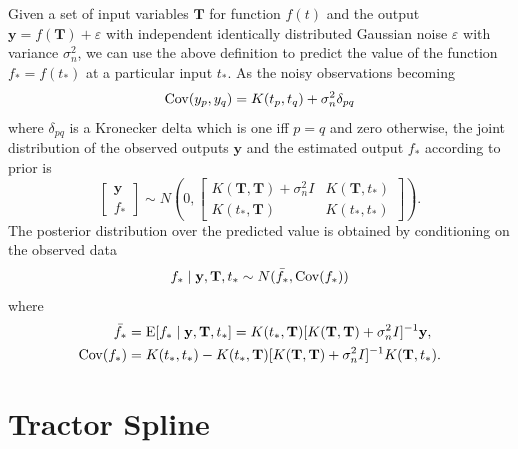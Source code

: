 Given a set of input variables $\mathbf{T}$ for function $f(t)$ and the output $\mathbf{y}=f(\mathbf{T})+\varepsilon$ with independent identically distributed Gaussian noise $\varepsilon$ with variance $\sigma_n^2$,  we can use the above definition to predict the value of the function $f_*=f(t_*)$ at a particular input $t_*$. As the noisy observations becoming
\begin{align}\label{GaussianProcessCovDef}
\mathrm{Cov} (y_p,y_q) = K(t_p,t_q)+\sigma_n^2 \delta_{pq}
\end{align}
where $\delta_{pq}$ is a Kronecker delta which is one iff $p=q$ and zero otherwise, the joint distribution of the observed outputs $\mathbf{y}$ and the estimated output $f_*$ according to prior is
\begin{equation}
\begin{bmatrix}
\mathbf{y}\\
f_*
\end{bmatrix} \sim N \left(  
0,  \begin{bmatrix}
K(\mathbf{T},\mathbf{T}) +\sigma_n^2I& K(\mathbf{T},t_*) \\
K(t_*,\mathbf{T}) & K(t_*,t_*)
\end{bmatrix} 
\right).
\end{equation}
The posterior distribution over the predicted value is obtained by conditioning on the observed data
\begin{equation}
f_* \mid  \mathbf{y},\mathbf{T},t_* \sim N(\bar{f_*},\mathrm{Cov} (f_*))
\end{equation}
where 
\begin{align}
\bar{f_*}&=\mathrm{E} [f_* \mid  \mathbf{y},\mathbf{T},t_* ]=K(t_*,\mathbf{T})[K(\mathbf{T},\mathbf{T})+\sigma_n^2I]^{-1}\mathbf{y},\\
\mathrm{Cov}(f_*)&=K(t_*,t_*)-K(t_*,\mathbf{T})[K(\mathbf{T},\mathbf{T})+\sigma_n^2I]^{-1}K(\mathbf{T},t_*).
\end{align}










\section{Tractor Spline}


